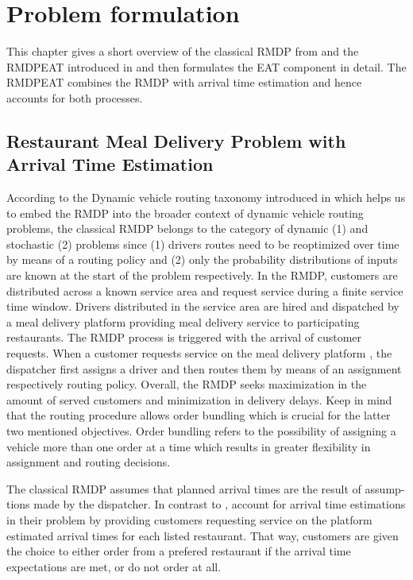 \chapter{Problem formulation}

This chapter gives a short overview of the classical RMDP from \cite{UlmerRMDP} and the RMDPEAT introduced in \cite{Hildebrandt2020_EAT} and then formulates the EAT component in detail. The RMDPEAT combines the RMDP with arrival time estimation and hence accounts for both processes. 
\section{Restaurant Meal Delivery Problem with Arrival Time Estimation}
According to the Dynamic vehicle routing taxonomy introduced in \cite{psaraftis} which helps us to embed the RMDP into the broader context of dynamic vehicle routing problems, the classical RMDP belongs to the category of dynamic (1) and stochastic (2) problems since (1) drivers routes need to be reoptimized over time by means of a routing policy and (2) only the probability distributions of inputs are known at the start of the problem respectively. In the RMDP, customers are distributed across a known service area and request service during a finite service time window. Drivers distributed in the service area are hired and dispatched by a meal delivery platform providing meal delivery service to participating restaurants. The RMDP process is triggered with the arrival of customer requests. When a customer requests service on the meal delivery platform , the dispatcher first assigns a driver and then routes them by means of an assignment respectively routing policy. Overall, the RMDP seeks maximization in the amount of served customers and minimization in delivery delays. Keep in mind that the routing procedure allows order bundling which is crucial for the latter two mentioned objectives. Order bundling refers to the possibility of assigning a vehicle more than one order at a time which results in greater flexibility in assignment and routing decisions.

The classical RMDP assumes that planned arrival times are the result of assump-tions made by the dispatcher. In contrast to \citet{UlmerRMDP}, \citet{Hildebrandt2020_EAT} account for arrival time estimations in their problem by providing customers requesting service on the platform estimated arrival times for each listed restaurant. That way, customers are given the choice to either order from a prefered restaurant if the arrival time expectations are met, or do not order at all. 


